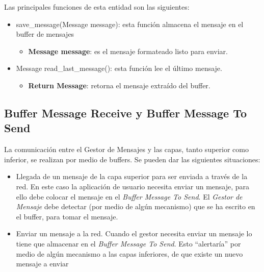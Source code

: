 Las principales funciones de esta entidad son las siguientes:
\begin{itemize}
\item save\_message(Message message): esta función almacena el mensaje en
  el buffer de mensajes
  \begin{itemize}
  \item \textbf{Message message}: es el mensaje formateado listo para enviar.
  \end{itemize}
  
\item Message read\_last\_message(): esta función lee el último mensaje.
  \begin{itemize}
    \item \textbf{Return Message}: retorna el mensaje extraído del buffer.
  \end{itemize}
  
\end{itemize}


\subsection{Buffer Message Receive y Buffer Message To Send}
La comunicación entre el Gestor de Mensajes y las capas, tanto
superior como inferior, se realizan por medio de buffers. Se pueden dar las
siguientes situaciones:
\begin{itemize}
\item Llegada de un mensaje de la capa superior para ser enviada a través de la
  red. En este caso la aplicación de usuario necesita enviar un mensaje, para
  ello debe colocar el mensaje en el \textit{Buffer Message To Send}. El 
  \textit{Gestor de Mensaje} debe detectar (por medio de algún mecanismo) que se
  ha escrito en el buffer, para tomar el mensaje.
\item Enviar un mensaje a la red. Cuando el gestor necesita enviar un mensaje
  lo tiene que almacenar en el \textit{Buffer Message To Send}. Esto ``alertaría''
  por medio de algún mecanismo a las capas inferiores, de que existe un nuevo
  mensaje a enviar  
\end{itemize}

